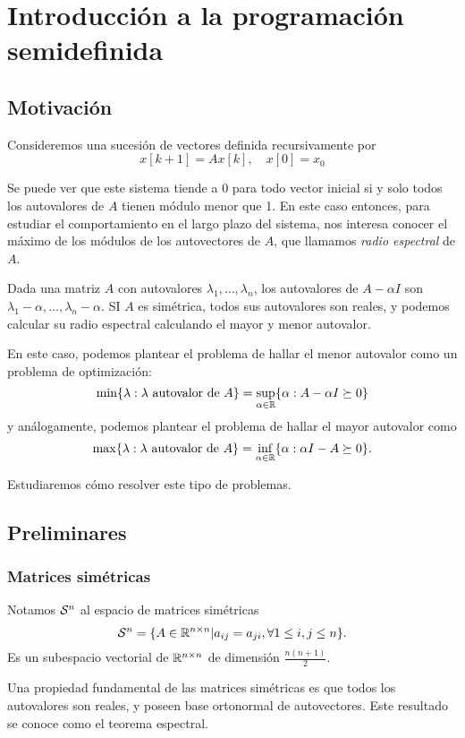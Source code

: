 \chapter{Introducci\'on a la programaci\'on semidefinida}

\section{Motivación}
Consideremos una sucesión de vectores definida recursivamente por
$$
x[k + 1] = A x[k], \quad x[0] = x_0
$$

Se puede ver que este sistema tiende a 0 para todo vector inicial si y solo todos los autovalores de $A$ tienen módulo menor que 1.
En este caso entonces, para estudiar el comportamiento en el largo plazo del sistema, nos interesa conocer el máximo de los módulos de los autovectores de $A$, que llamamos \emph{radio espectral} de $A$.

Dada una matriz $A$ con autovalores $\lambda_1, \dots, \lambda_n$, los autovalores de $A - \alpha I$ son $\lambda_1 - \alpha, \dots, \lambda_n - \alpha$. SI $A$ es simétrica, todos sus autovalores son reales, y podemos calcular su radio espectral calculando el mayor y menor autovalor.

En este caso, podemos plantear el problema de hallar el menor autovalor como un problema de optimización:
$$
\min \{\lambda : \lambda \text{ autovalor de $A$}\} = \sup_{\alpha \in \mathbb{R}} \{\alpha : A - \alpha I \succeq 0\}
$$
y análogamente, podemos plantear el problema de hallar el mayor autovalor como
$$
\max \{\lambda : \lambda \text{ autovalor de $A$}\} = \inf_{\alpha \in \mathbb{R}} \{\alpha : \alpha I - A \succeq 0\}.
$$

Estudiaremos cómo resolver este tipo de problemas.

\section{Preliminares}

\subsection{Matrices simétricas}

Notamos ${\mathcal S}^n$ al espacio de matrices simétricas
$$
{\mathcal S}^n = \{A \in \mathbb{R}^{n \times n} | a_{ij} = a_{ji}, \forall 1 \le i, j \le n\}.
$$
Es un subespacio vectorial de $\mathbb{R}^{n \times n}$ de dimensión $\frac{n(n+1)}{2}$.

Una propiedad fundamental de las matrices simétricas es que todos los autovalores son reales, y poseen base ortonormal de autovectores.
Este resultado se conoce como el teorema espectral.

